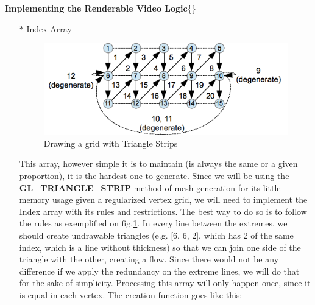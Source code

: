 \documentclass[12pt, a4paper]{report}
\newenvironment{loggentry}[2]%
{\noindent\textbf{#2}\newline\{\marginnote{#1}\}\newline\\}{\vspace{1.0cm}}
\begin{document}
\begin{loggentry}{06-06-2019}{Implementing the Renderable Video Logic}
\begin{itemize}
\begin{itemize}
								\begin{verbatim}

VideoCapture video(videoPath);
...
int size = this->getWidth() * this->getHeight() * 3;
uint8_t * buff = (uint8_t *)malloc(size * sizeof(uint8_t));
Mat frame;
video >> frame;
memcpy(buff, mat.ptr(0), mat.cols*mat.rows * sizeof(uint8_t) * 3);
...
//Color for pixel in index
GLfloat R = ((GLfloat) buff[index + 2])/256;
GLfloat G = ((GLfloat) buff[index + 1])/256;
GLfloat B = ((GLfloat) buff[index])/256;
...
								\end{verbatim}

								In this case, \textit{index} is both the array's and frame's counter. They are both processed the same way.

							\item[$\ast$] Index Array

	\begin{figure}
		\includegraphics[scale=1.0, center]{./res/strip.png}
		\caption{Drawing a grid with Triangle Strips}
		\label{fig:newInterp}
	\end{figure}

								This array, however simple it is to maintain (is always the same or a given proportion), it is the hardest one to generate.
								Since we will be using the \textbf{GL\_TRIANGLE\_STRIP} method of mesh generation for its little memory usage given a regularized vertex grid, we will need to implement the Index array with its rules and restrictions.
								The best way to do so is to follow the rules as exemplified on fig.\ref{fig:newInterp}.
								In every line between the extremes, we should create undrawable triangles (e.g. [6, 6, 2], which has 2 of the same index, which is a line without thickness) so that we can join one side of the triangle with the other, creating a flow. Since there would not be any difference if we apply the redundancy on the extreme lines, we will do that for the sake of simplicity. 
								Processing this array will only happen once, since it is equal in each vertex. The creation function goes like this:


\end{itemize}
\end{itemize}
\end{loggentry}
\end{document}
